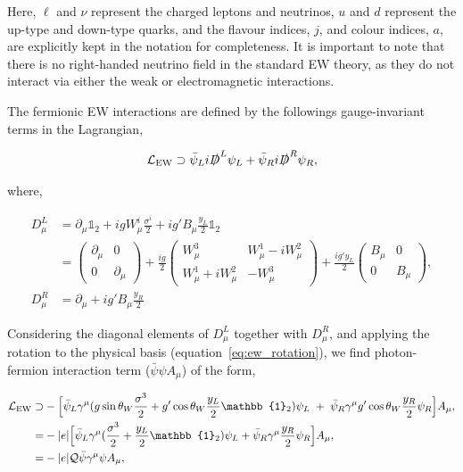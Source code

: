 \noindent
Here, $\ell$ and $\nu$ represent the charged leptons and neutrinos, $u$ and $d$ represent the up-type and down-type quarks, and the flavour indices, $j$, and colour indices, $a$, are explicitly kept in the notation for completeness. It is important to note that there is no right-handed neutrino field in the standard EW theory, as they do not interact via either the weak or electromagnetic interactions.

The fermionic EW interactions are defined by the followings gauge-invariant terms in the Lagrangian,

\begin{equation}\label{eq:ew_interactionterms}
    \mathcal{L}_{\rm{EW}} \supset \bar{\psi}_L i \slashed{D}^L \psi_L + \bar{\psi}_R i \slashed{D}^R \psi_R,
\end{equation}

\noindent
where,

\begin{equation}
\begin{split}
    D^L_\mu &= \partial_\mu \mathbb{1}_2 + igW^i_\mu \frac{\sigma^i}{2} + ig'B_\mu \frac{y_L}{2} \mathbb{1}_2 
    \\
    &= \begin{pmatrix}
    \partial_\mu & 0 \\
    0 & \partial_\mu
    \end{pmatrix} + \frac{ig}{2}\begin{pmatrix}
    W^3_\mu & W^1_\mu-iW^2_\mu \\
    W^1_\mu+iW^2_\mu & -W^3_\mu
    \end{pmatrix} + \frac{ig'y_L}{2}\begin{pmatrix}
    B_\mu & 0 \\
    0 & B_\mu
    \end{pmatrix},
    \\
    D^R_\mu &= \partial_\mu + ig'B_\mu \frac{y_R}{2}
\end{split}
\end{equation}

\noindent
Considering the diagonal elements of $D^L_\mu$ together with $D^R_\mu$, and applying the rotation to the physical basis (equation~\ref{eq:ew_rotation}), we find photon-fermion interaction term ($\bar{\psi}\psi A_\mu$) of the form,

\begin{equation}
\begin{split}
    \mathcal{L}_{\rm{EW}} \supset &-\Big[ \bar{\psi}_L \gamma^\mu(g\sin{\theta_W} \frac{\sigma^3}{2} + g'\cos{\theta_W} \frac{y_L}{2} \mathbb{1}_2)\psi_L \; + \; \bar{\psi}_R\gamma^\mu g'\cos{\theta_W}\frac{y_R}{2}\psi_R \Big]A_\mu,
    \\
    = &-|e|\Big[ \bar{\psi}_L \gamma^\mu (\frac{\sigma^3}{2}+\frac{y_L}{2} \mathbb{1}_2)\psi_L + \bar{\psi}_R\gamma^\mu \frac{y_R}{2}\psi_R \Big]A_\mu,
    \\
    = & - |e|\mathcal{Q} \bar{\psi} \gamma^\mu \psi A_\mu,
\end{split}
\end{equation}


